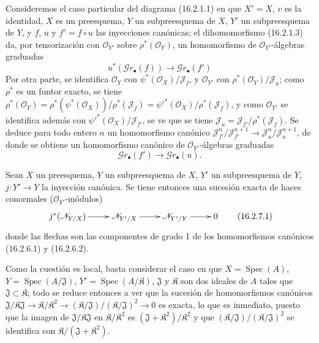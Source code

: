 \begin{env}[16.2.6]
\label{IV.16.2.6}
Consideremos el caso particular del diagrama (16.2.1.1) en que $X'=X$, $v$ es
la identidad, $X$ es un preesquema, $Y$ un subpreesquema de $X$, $Y'$ un
subpreesquema de $Y$, y $f$, $u$ y $f'=f\circ u$ las inyecciones canónicas; el
dihomomorfismo (16.2.1.3) da, por tensorización con
$\mathcal{O}_{Y'}$ sobre $\rho^*(\mathcal{O}_Y)$, un homomorfismo de
$\mathcal{O}_{Y'}$-álgebras graduadas
\[
  u^*(\mathscr{G}r_\bullet(f))
  \longrightarrow\mathscr{G}r_\bullet(f')
  \tag{16.2.6.1}
  \label{IV.16.2.6.1}
\]
Por otra parte, se identifica $\mathcal{O}_Y$ con
$\psi^*(\mathcal{O}_X)/\mathscr J_f$, y $\mathcal{O}_{Y'}$ con
$\rho^*(\mathcal{O}_Y)/\mathscr J_u$; como $\rho^*$ es un funtor exacto,
se tiene
$\rho^*(\mathcal{O}_Y)=
\rho^*(\psi^*(\mathcal{O}_X))/\rho^*(\mathscr J_f)=
\psi'^*(\mathcal{O}_X)/\rho^*(\mathscr J_f)$, y como
$\mathcal{O}_{Y'}$ se identifica además con
$\psi'^*(\mathcal{O}_X)/\mathscr J_{f'}$, se ve que se tiene
$\mathscr J_u=\mathscr J_{f'}/\rho^*(\mathscr J_f)$. Se deduce para
todo entero $n$ un homomorfismo canónico
$\mathscr J_{f'}^n/\mathscr J_{f'}^{n+1}\to
\mathscr J_u^n/\mathscr J_u^{n+1}$, de donde se obtiene un homomorfismo canónico de
$\mathcal{O}_{Y'}$-álgebras graduadas
\[
  \mathscr{G}r_\bullet(f')
  \longrightarrow\mathscr{G}r_\bullet(u).
  \tag{16.2.6.2}
  \label{IV.16.2.6.2}
\]
\end{env}

\begin{proposition}[16.2.7]
\label{IV.16.2.7}
Sean $X$ un preesquema, $Y$ un subpreesquema de $X$, $Y'$ un
subpreesquema de $Y$, $j:Y'\to Y$ la inyección canónica. Se tiene entonces una sucesión
exacta de haces conormales ($\mathcal{O}_{Y'}$-módulos)
\[
  \xymatrix{
    j^*(\mathscr{N}_{Y/X}) \ar[r] &
    \mathscr{N}_{Y'/X} \ar[r] &
    \mathscr{N}_{Y'/Y} \ar[r] & 0
  }
  \tag{16.2.7.1}
  \label{IV.16.2.7.1}
\]
donde las flechas son las componentes de grado 1 de los homomorfismos canónicos
\textup{(16.2.6.1)} y \textup{(16.2.6.2)}.
\end{proposition}

Como la cuestión es local, basta considerar el caso en que
$X=\operatorname{Spec}(A)$, $Y=\operatorname{Spec}(A/\mathfrak J)$,
$Y'=\operatorname{Spec}(A/\mathfrak{K})$, $\mathfrak J$ y $\mathfrak{K}$
son dos ideales de $A$ tales que $\mathfrak J\subset\mathfrak{K}$; todo
se reduce entonces a ver
que la sucesión de homomorfismos canónicos
$\mathfrak J/\mathfrak{K}\mathfrak J\to
\mathfrak{K}/\mathfrak{K}^2\to
(\mathfrak{K}/\mathfrak J)/(\mathfrak{K}/\mathfrak J)^2\to 0$
es exacta, lo que es inmediato, puesto que la imagen de
$\mathfrak J/\mathfrak{K}\mathfrak J$ en
$\mathfrak{K}/\mathfrak{K}^2$ es
$(\mathfrak J+\mathfrak{K}^2)/\mathfrak{K}^2$ y que
$(\mathfrak{K}/\mathfrak J)/(\mathfrak{K}/\mathfrak J)^2$ se identifica con
$\mathfrak{K}/(\mathfrak J+\mathfrak{K}^2)$.

